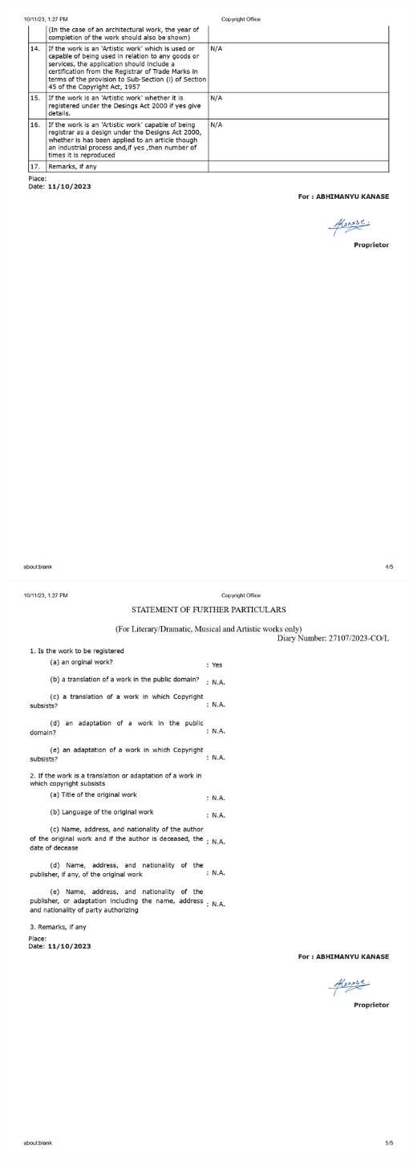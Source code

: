 \documentclass[12pt,a4paper]{report}
\begin{document}
\includegraphics[scale =0.7]{images/copyright/Form14_page-0004.jpg}
\newpage
\includegraphics[scale =0.7]{images/copyright/Form14_page-0005.jpg }
\newpage
\end{document}
